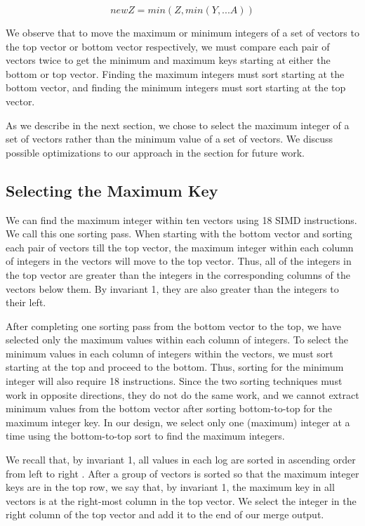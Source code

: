 \documentclass[10pt,twocolumn]{article}
\begin{document}
$$newZ = min(Z, min(Y, ... A))$$

We observe that to move the maximum or minimum integers of a set of vectors to the top vector or bottom vector respectively, we must compare each pair of vectors twice to get the minimum and maximum keys starting at either the bottom or top vector.  Finding the maximum integers must sort starting at the bottom vector, and finding the minimum integers must sort starting at the top vector.

As we describe in the next section, we chose to select the maximum integer of a set of vectors rather than the minimum value of a set of vectors.  We discuss possible optimizations to our approach in the section for future work.

\subsection{Selecting the Maximum Key}
We can find the maximum integer within ten vectors using 18 SIMD instructions.  We call this one sorting pass.  When starting with the bottom vector and sorting each pair of vectors till the top vector, the maximum integer within each column of integers in the vectors will move to the top vector.  Thus, all of the integers in the top vector are greater than the integers in the corresponding columns of the vectors below them.  By invariant 1, they are also greater than the integers to their left.

After completing one sorting pass from the bottom vector to the top, we have selected only the maximum values within each column of integers.  To select the minimum values in each column of integers within the vectors, we must sort starting at the top and proceed to the bottom.  Thus, sorting for the minimum integer will also require 18 instructions.  Since the two sorting techniques must work in opposite directions, they do not do the same work, and we cannot extract minimum values from the bottom vector after sorting bottom-to-top for the maximum integer key.  In our design, we select only one (maximum) integer at a time using the bottom-to-top sort to find the maximum integers.

We recall that, by invariant 1, all values in each log are sorted in ascending order from left to right .  After a group of vectors is sorted so that the maximum integer keys are in the top row, we say that, by invariant 1, the maximum key in all vectors is at the right-most column in the top vector.  We select the integer in the right column of the top vector and add it to the end of our merge output.
\end{document}
